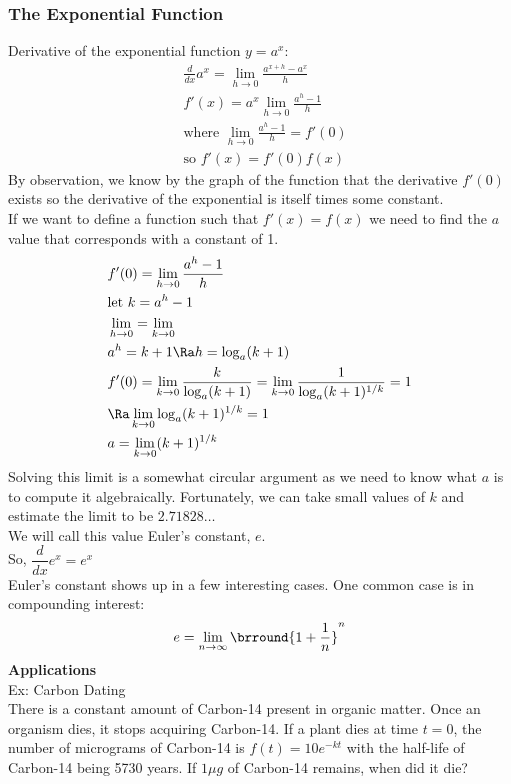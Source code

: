 \subsubsection{The Exponential Function}
Derivative of the exponential function $y=a^x$:
\begin{align*}
    &\frac{d}{dx}a^x=\lim_{h\to 0}\frac{a^{x+h}-a^x}{h}\\
    &f'(x)=a^x\lim_{h\to 0}\frac{a^h-1}{h}\\
    &\text{where }\lim_{h\to 0}\frac{a^h-1}{h}=f'(0)\\
    &\text{so }f'(x)=f'(0)f(x)
\end{align*}
By observation, we know by the graph of the function that the derivative $f'(0)$ exists so the derivative of the exponential is itself times some constant.\\
If we want to define a function such that $f'(x)=f(x)$ we need to find the $a$ value that corresponds with a constant of 1.
\begin{align*}
    &f'(0)=\lim_{h\to 0}\frac{a^h-1}{h}\\
    &\text{let }k=a^h-1\\
    &\lim_{h\to 0}=\lim_{k\to 0}\\
    &a^h=k+1\Ra h=\log_a(k+1)\\
    &f'(0)=\lim_{k\to 0}\frac{k}{\log_a(k+1)}=\lim_{k\to 0}\frac{1}{\log_a(k+1)^{1/k}}=1\\
    &\Ra\lim_{k\to 0}\log_a(k+1)^{1/k}=1\\
    &a=\lim_{k\to 0}(k+1)^{1/k}
\end{align*}
Solving this limit is a somewhat circular argument as we need to know what $a$ is to compute it algebraically. Fortunately, we can take small values of $k$ and estimate the limit to be $2.71828\ldots$\\
We will call this value Euler's constant, $e$.\\
So, $\dfrac{d}{dx}e^x=e^x$\\
Euler's constant shows up in a few interesting cases. One common case is in compounding interest:
$$e=\lim_{n\to \infty}\brround{1+\frac{1}{n}}^n$$
\textbf{Applications}\\
Ex: Carbon Dating\\
There is a constant amount of Carbon-14 present in organic matter. Once an organism dies, it stops acquiring Carbon-14. If a plant dies at time $t=0$, the number of micrograms of Carbon-14 is $f(t)=10e^{-kt}$ with the half-life of Carbon-14 being 5730 years. If $1\mu g$ of Carbon-14 remains, when did it die?
